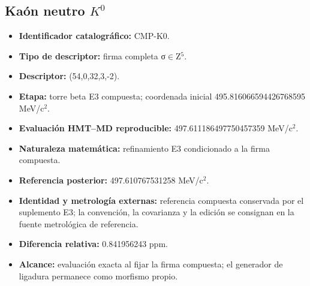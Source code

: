 \subsection{Kaón neutro \texorpdfstring{\(K^{0}\)}{K0}}
\begin{itemize}
\item \textbf{Identificador catalográfico:} CMP-K0.
\item \textbf{Tipo de descriptor:} firma completa σ\(\in\)Z\({}^{5}\).
\item \textbf{Descriptor:} (54,0,32,3,-2).
\item \textbf{Etapa:} torre beta E3 compuesta; coordenada inicial 495.816066\allowbreak{}594426\allowbreak{}768595 MeV/c\({}^{2}\).
\item \textbf{Evaluación HMT--MD reproducible:} 497.611186\allowbreak{}497750\allowbreak{}457359 MeV/c\({}^{2}\).
\item \textbf{Naturaleza matemática:} refinamiento E3 condicionado a la firma compuesta.
\item \textbf{Referencia posterior:} 497.610767\allowbreak{}531258 MeV/c\({}^{2}\).
\item \textbf{Identidad y metrología externas:} referencia compuesta conservada por el suplemento E3; la convención, la covarianza y la edición se consignan en la fuente metrológica de referencia.
\item \textbf{Diferencia relativa:} 0.841956\allowbreak{}243 ppm.
\item \textbf{Alcance:} evaluación exacta al fijar la firma compuesta; el generador de ligadura permanece como morfismo propio.
\end{itemize}
